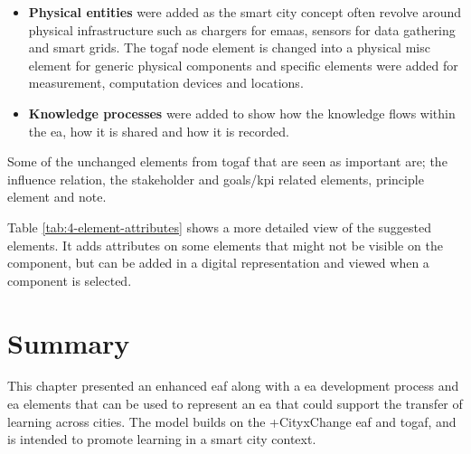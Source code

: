 \begin{itemize}
    \item \textbf{Physical entities} were added as the smart city concept often revolve around physical infrastructure such as chargers for \gls{emaas}, sensors for data gathering and smart grids. The \gls{togaf} node element is changed into a physical misc element for generic physical components and specific elements were added for measurement, computation devices and locations.
    \item \textbf{Knowledge processes} were added to show how the knowledge flows within the \gls{ea}, how it is shared and how it is recorded.
\end{itemize}
 
Some of the unchanged elements from \gls{togaf} that are seen as important are; the influence relation, the stakeholder and goals/\gls{kpi} related elements, principle element and note. 


Table \ref{tab:4-element-attributes} shows a more detailed view of the suggested elements. It adds attributes on some elements that might not be visible on the component, but can be added in a digital representation and viewed when a component is selected.  

\section{Summary}
This chapter presented an enhanced \gls{eaf} along with a \gls{ea} development process and \gls{ea} elements that can be used to represent an \gls{ea} that could support the transfer of learning across cities. The model builds on the +CityxChange \gls{eaf} and \gls{togaf}, and is intended to promote learning in a smart city context.